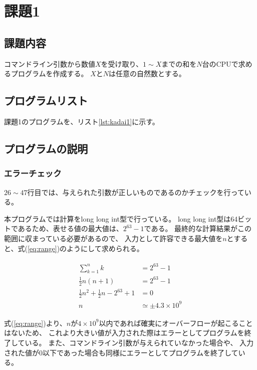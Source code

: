 \documentclass[a4j,titlepage]{jsarticle}
\begin{document}



\section{課題1}
\subsection{課題内容}
コマンドライン引数から数値$X$を受け取り、$1 \sim X$までの和を$N$台のCPUで求めるプログラムを作成する。
$X$と$N$は任意の自然数とする。

\subsection{プログラムリスト}
課題1のプログラムを、リスト\ref{lst:kadai1}に示す。



\subsection{プログラムの説明}
\subsubsection{エラーチェック}
$26 \sim 47$行目では、与えられた引数が正しいものであるのかチェックを行っている。

本プログラムでは計算をlong long int型で行っている。
long long int型は64ビットであるため、表せる値の最大値は、$2^{63} - 1$である。
最終的な計算結果がこの範囲に収まっている必要があるので、
入力として許容できる最大値を$n$とすると、式(\ref{eq:range})のようにして求められる。

\begin{align}
  \begin{aligned}
    \sum^{n}_{k = 1} k &= 2^{63} - 1 \\
    \frac{1}{2} n (n + 1) &= 2^{63} - 1 \\
    \frac{1}{2} n^2 + \frac{1}{2} n - 2^{63} + 1 &= 0 \\
    n &\simeq \pm 4.3 \times 10^9
    \label{eq:range}
  \end{aligned}
\end{align}

式(\ref{eq:range})より、$n$が$4 \times 10^9$以内であれば確実にオーバーフローが起こることはないため、
これより大きい値が入力された際はエラーとしてプログラムを終了している。
また、コマンドライン引数が与えられていなかった場合や、
入力された値が0以下であった場合も同様にエラーとしてプログラムを終了している。
\end{document}
